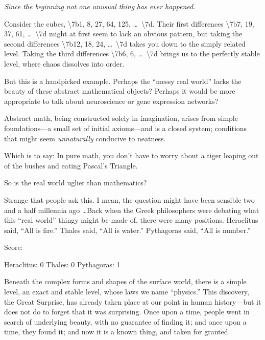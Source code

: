 {
 \textit{Since the beginning}\newline
\textit{ not one unusual thing}\newline
\textit{ has ever happened.}}

\myendsectiontext


{
 Consider the cubes, {\textbackslash}{\textquotesingle}7b1, 8, 27,
64, 125, \ldots~{\textbackslash}{\textquotesingle}7d. Their first
differences {\textbackslash}{\textquotesingle}7b7, 19, 37, 61,
\ldots~{\textbackslash}{\textquotesingle}7d might at first seem to lack
an obvious pattern, but taking the second differences
{\textbackslash}{\textquotesingle}7b12, 18, 24,
\ldots~{\textbackslash}{\textquotesingle}7d takes you down to the simply
related level. Taking the third differences
{\textbackslash}{\textquotesingle}7b6, 6,
\ldots~{\textbackslash}{\textquotesingle}7d brings us to the perfectly
stable level, where chaos dissolves into order. }

{
 But this is a handpicked example. Perhaps the
``messy real world'' lacks the
beauty of these abstract mathematical objects? Perhaps it would be more
appropriate to talk about neuroscience or gene expression networks?}

{
 Abstract math, being constructed solely in imagination, arises
from simple foundations---a small set of initial axioms---and is a
closed system; conditions that might seem \textit{unnaturally}
conducive to neatness.}

{
 Which is to say: In pure math, you don't have to
worry about a tiger leaping out of the bushes and eating
Pascal's Triangle.}

{
 So is the real world uglier than mathematics?}

{
 Strange that people ask this. I mean, the question might have been
sensible two and a half millennia ago \ldots Back when the Greek
philosophers were debating what this ``real
world'' thingy might be made of, there were many
positions. Heraclitus said, ``All is
fire.'' Thales said, ``All is
water.'' Pythagoras said, ``All is
number.''}

{
 Score:}

{\centering
 Heraclitus: 0\newline
 Thales: 0\newline
 Pythagoras: 1
\par}


\bigskip

{
 Beneath the complex forms and shapes of the surface world, there
is a simple level, an exact and stable level, whose laws we name
``physics.'' This discovery, the
Great Surprise, has already taken place at our point in human
history---but it does not do to forget that it was surprising. Once
upon a time, people went in search of underlying beauty, with no
guarantee of finding it; and once upon a time, they found it; and now
it is a known thing, and taken for granted.}

